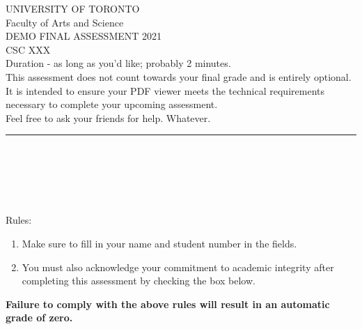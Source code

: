 \documentclass[addpoints]{exam}
\begin{document}
\begin{coverpages}
  \begin{center}
    \large
    UNIVERSITY OF TORONTO\\
    Faculty of Arts and Science\\[.5cm]

    DEMO FINAL ASSESSMENT 2021\\[.5cm]

    CSC XXX\\[.5cm]

    Duration - as long as you'd like; probably 2 minutes. \\[.5cm]

    This assessment does not count towards your final grade and is entirely
    optional. It is intended to ensure your PDF viewer meets the technical
    requirements necessary to complete your upcoming assessment. \\[.5cm]

    Feel free to ask your friends for help. Whatever.
  \end{center}

  \hrule\vspace*{1em}
  \begin{minipage}{0.9\textwidth}
     \\
    \\  \\ \\
    \\
    \noindent Rules:
    \begin{enumerate}
    \item Make sure to fill in your name and student number in the fields.
    \item You must also acknowledge your commitment to academic integrity
          after completing this assessment by checking the box below.
    \end{enumerate}

    \textbf{ %
      Failure to comply with the above rules will result in an automatic
      grade of zero.
    }


\end{minipage}
\end{coverpages}
\end{document}
